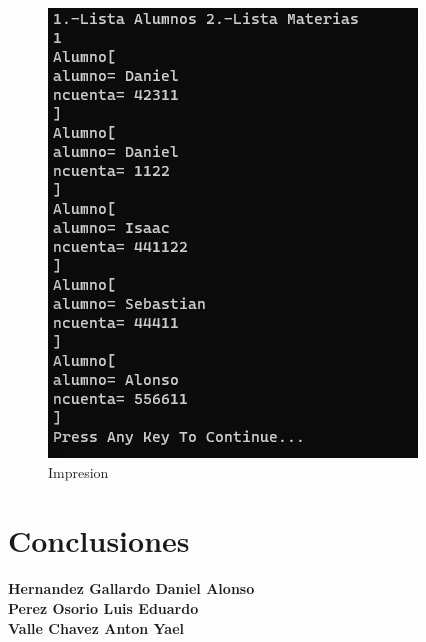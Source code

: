 \documentclass{report}
\begin{document}
\begin{figure}[h]
    \centering
    \includegraphics[width=1\linewidth]{Imagen10.png}
    \caption{Impresion}
    
\end{figure}
















\chapter{Conclusiones}
\textbf{Hernandez Gallardo Daniel Alonso} \\
\newpage
\textbf{Perez Osorio Luis Eduardo} \\

\newpage
\textbf{Valle Chavez Anton Yael} \\
\newpage
\nocite{*}
  \newpage

\end{document}
